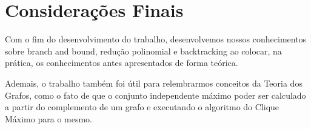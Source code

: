 \documentclass[12pt]{article}
\begin{document}
\clearpage
\section{Considerações Finais}
    \par Com o fim do desenvolvimento do trabalho, desenvolvemos nossos conhecimentos sobre branch and bound, redução polinomial e backtracking ao colocar, na prática, os conhecimentos antes apresentados de forma teórica.

    \par Ademais, o trabalho também foi útil para relembrarmos conceitos da Teoria dos Grafos, como o fato de que o conjunto independente máximo poder ser calculado a partir do complemento de um grafo e executando o algoritmo do Clique Máximo para o mesmo.

\clearpage

\end{document}
